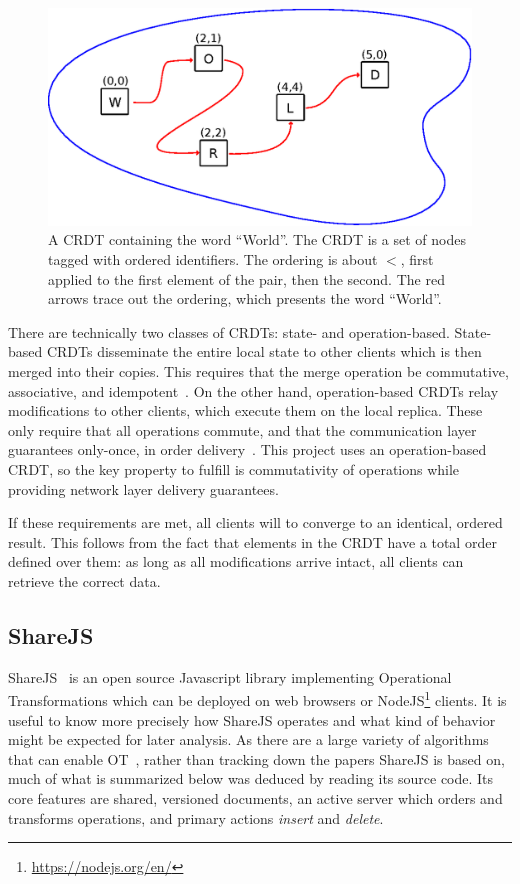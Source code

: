 \documentclass[12pt,a4paper,twoside,openright]{report}
\begin{document}
	\begin{figure}[H]
	\centering
	\includegraphics[width=1\linewidth]{figs/tagged_set.eps}
	\caption[Text CRDT as a tagged set]{A CRDT containing the word ``World''. The CRDT is a set of nodes tagged with ordered identifiers. The ordering is about $<$, first applied to the first element of the pair, then the second. The red arrows trace out the ordering, which presents the word ``World''.}
	\label{fig:taggedset}
	\end{figure}
	
	There are technically two classes of CRDTs: state- and operation-based. State-based CRDTs disseminate the entire local state to other clients which is then merged into their copies. This requires that the merge operation be commutative, associative, and idempotent~\cite{shapiro2011}. On the other hand, operation-based CRDTs relay modifications to other clients, which execute them on the local replica. These only require that all operations commute, and that the communication layer guarantees only-once, in order delivery~\cite{takada2013}. This project uses an operation-based CRDT, so the key property to fulfill is commutativity of operations while providing network layer delivery guarantees.
	
	If these requirements are met, all clients will to converge to an identical, ordered result. This follows from the fact that elements in the CRDT have a total order defined over them: as long as all modifications arrive intact, all clients can retrieve the correct data.

	\subsection{ShareJS} \label{sec:sharejs}
	
	ShareJS~\cite{sharejs} is an open source Javascript library implementing Operational Transformations which can be deployed on web browsers or NodeJS\footnote{\url{https://nodejs.org/en/}} clients. It is useful to know more precisely how ShareJS operates and what kind of behavior might be expected for later analysis. As there are a large variety of algorithms that can enable OT~\cite{kumawat2016}, rather than tracking down the papers ShareJS is based on, much of what is summarized below was deduced by reading its source code. Its core features are shared, versioned documents, an active server which orders and transforms operations, and primary actions \textit{insert} and \textit{delete}.
	
\end{document}
